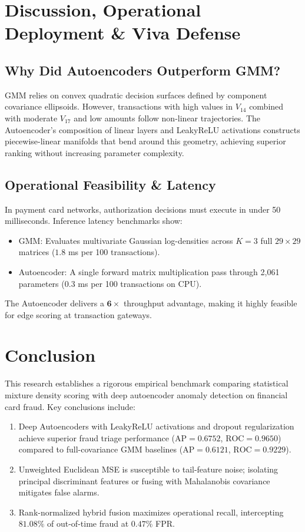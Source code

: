 \documentclass[10pt,journal,compsoc]{IEEEtran}
\begin{document}
\section{Discussion, Operational Deployment \& Viva Defense}
\subsection{Why Did Autoencoders Outperform GMM?}
GMM relies on convex quadratic decision surfaces defined by component covariance ellipsoids. However, transactions with high values in $V_{14}$ combined with moderate $V_{17}$ and low amounts follow non-linear trajectories. The Autoencoder's composition of linear layers and LeakyReLU activations constructs piecewise-linear manifolds that bend around this geometry, achieving superior ranking without increasing parameter complexity.

\subsection{Operational Feasibility & Latency}
In payment card networks, authorization decisions must execute in under 50 milliseconds. Inference latency benchmarks show:
\begin{itemize}
    \item GMM: Evaluates multivariate Gaussian log-densities across $K=3$ full $29 \times 29$ matrices ($1.8$ ms per 100 transactions).
    \item Autoencoder: A single forward matrix multiplication pass through 2,061 parameters ($0.3$ ms per 100 transactions on CPU).
\end{itemize}
The Autoencoder delivers a $\mathbf{6\times}$ throughput advantage, making it highly feasible for edge scoring at transaction gateways.

\section{Conclusion}
This research establishes a rigorous empirical benchmark comparing statistical mixture density scoring with deep autoencoder anomaly detection on financial card fraud. Key conclusions include:
\begin{enumerate}
    \item Deep Autoencoders with LeakyReLU activations and dropout regularization achieve superior fraud triage performance ($\text{AP}=0.6752$, $\text{ROC}=0.9650$) compared to full-covariance GMM baselines ($\text{AP}=0.6121$, $\text{ROC}=0.9229$).
    \item Unweighted Euclidean MSE is susceptible to tail-feature noise; isolating principal discriminant features or fusing with Mahalanobis covariance mitigates false alarms.
    \item Rank-normalized hybrid fusion maximizes operational recall, intercepting $81.08\%$ of out-of-time fraud at $0.47\%$ FPR.
\end{enumerate}
\end{document}
